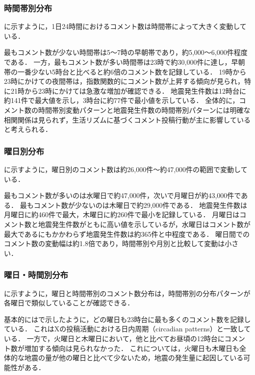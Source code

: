 \subsubsection{時間帯別分布}
に示すように，1日24時間におけるコメント数は時間帯によって大きく変動している．



最もコメント数が少ない時間帯は5〜7時の早朝帯であり，約5,000〜6,000件程度である．
一方，最もコメント数が多い時間帯は23時で約30,000件に達し，早朝帯の一番少ない5時台と比べると約6倍のコメント数を記録している．
19時から23時にかけての夜間帯は，指数関数的にコメント数が上昇する傾向が見られ，特に21時から23時にかけては急激な増加が確認できる．
地震発生件数は12時台に約141件で最大値を示し，3時台に約77件で最小値を示している．
全体的に，コメント数の時間帯別変動パターンと地震発生件数の時間帯別パターンには明確な相関関係は見られず，生活リズムに基づくコメント投稿行動が主に影響していると考えられる．

\subsubsection{曜日別分布}
に示すように，曜日別のコメント数は約26,000件〜約47,000件の範囲で変動している．



最もコメント数が多いのは水曜日で約47,000件，次いで月曜日が約43,000件である．
最もコメント数が少ないのは木曜日で約29,000件である．
地震発生件数は月曜日に約460件で最大，木曜日に約260件で最小を記録している．
月曜日はコメント数と地震発生件数がともに高い値を示しているが，水曜日はコメント数が最大であるにもかかわらず地震発生件数は約365件と中程度である．
曜日間でのコメント数の変動幅は約1.8倍であり，時間帯別や月別と比較して変動は小さい．

\subsubsection{曜日・時間別分布}
に示すように，曜日と時間帯別のコメント数分布は，時間帯別の分布パターンが各曜日で類似していることが確認できる．



基本的にはで示したように，どの曜日も23時台に最も多くのコメント数を記録している．
これはXの投稿活動における日内周期（circadian patterns）と一致している\cite{tenThij2014circadian}．
一方で，火曜日と木曜日において，他と比べてお昼頃の12時台にコメント数が増加する傾向は見られなかった．
これについては，火曜日も木曜日も全体的な地震の量が他の曜日と比べて少ないため，地震の発生量に起因している可能性がある．

